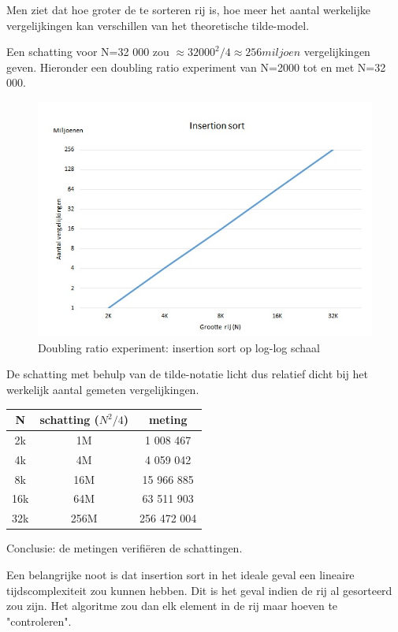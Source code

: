 \documentclass{article}
\begin{document}
Men ziet dat hoe groter de te sorteren rij is, hoe meer het aantal werkelijke vergelijkingen kan verschillen van het theoretische tilde-model. \newpage

Een schatting voor N=32 000 zou $\approx 32 000^2/4 \approx 256 miljoen $ vergelijkingen geven. Hieronder een doubling ratio experiment van N=2000 tot en met N=32 000.

\begin{figure}[h!]
\centering
\includegraphics[scale=0.9]{insertion_doubling.jpg}
\caption{Doubling ratio experiment: insertion sort op log-log schaal}
\label{fig:Insertion_doubling}
\end{figure}

De schatting met behulp van de tilde-notatie licht dus relatief dicht bij het werkelijk aantal gemeten vergelijkingen.

\centering{}
\begin{tabular}{| c | c | c |}
\hline
  N & schatting ($N^2/4$) & meting \\
  \hline
  2k & 1M & 1 008 467 \\
  \hline
  4k & 4M & 4 059 042 \\
  \hline
  8k & 16M & 15 966 885 \\
  \hline
  16k & 64M & 63 511 903 \\
  \hline
  32k & 256M & 256 472 004 \\
  \hline
\end{tabular}

\raggedright
Conclusie: de metingen verifiëren de schattingen.

Een belangrijke noot is dat insertion sort in het ideale geval een lineaire tijdscomplexiteit zou kunnen hebben. Dit is het geval indien de rij al gesorteerd zou zijn. Het algoritme zou dan elk element in de rij maar hoeven te "controleren".
\newpage
\end{document}
